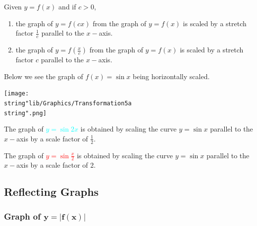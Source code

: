\documentclass[11pt,a4paper]{book}
\begin{document}
\begin{tcolorbox}[colback=blue!5, colframe=black,boxrule=.4pt, sharpish corners]

Given $y=f\left(x\right)$ and if $c>0$,

\begin{enumerate}[label=(\alph*)]

\item  the graph of $y=f\left(cx\right)$ from the graph of $y=f\left(x\right)$
is scaled by a stretch factor ${\displaystyle \frac{1}{c}}$ parallel
to the $x-$axis.

\item  the graph of ${\displaystyle y=f\left(\frac{x}{c}\right)}$
from the graph of $y=f\left(x\right)$ is scaled by a stretch factor
$c$ parallel to the $x-$axis.

\end{enumerate}
\end{tcolorbox}

\medskip

Below we see the graph of $f\left(x\right)=\sin x$ being horizontally
scaled.

\bigskip

\begin{minipage}[t]{0.5\textwidth}
\begin{center}
\texttt{[image: \\string"lib/Graphics/Transformation5a\\string".png]}
\par\end{center}

\end{minipage}
\begin{minipage}[t]{0.5\textwidth}

The graph of \textcolor{cyan}{$y=\sin2x$} is obtained by scaling
the curve $y=\sin x$ parallel to the $x-$axis by a scale factor
of ${\displaystyle \frac{1}{2}}$.

The graph of \textcolor{red}{${\displaystyle y=\sin\frac{x}{2}}$}
is obtained by scaling the curve $y=\sin x$ parallel to the $x-$axis
by a scale factor of $2$.

\end{minipage}
\newpage


\subsection{Reflecting Graphs}

\subsubsection{Graph of $\ensuremath{\mathbf{y=\left|f\left(x\right)\right|}}$}
\end{document}
